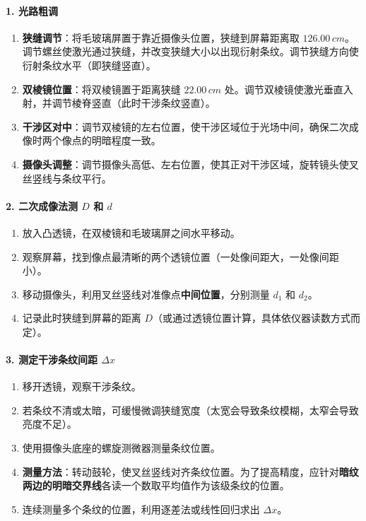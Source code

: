 \documentclass[yuxi]{../template/Report}%
\begin{document}
\paragraph{1. 光路粗调}
\begin{enumerate}
    \item \textbf{狭缝调节}：将毛玻璃屏置于靠近摄像头位置，狭缝到屏幕距离取 $126.00\,cm$。调节螺丝使激光通过狭缝，并改变狭缝大小以出现衍射条纹。调节狭缝方向使衍射条纹水平（即狭缝竖直）。
    \item \textbf{双棱镜位置}：将双棱镜置于距离狭缝 $22.00\,cm$ 处。调节双棱镜使激光垂直入射，并调节棱脊竖直（此时干涉条纹竖直）。
    \item \textbf{干涉区对中}：调节双棱镜的左右位置，使干涉区域位于光场中间，确保二次成像时两个像点的明暗程度一致。
    \item \textbf{摄像头调整}：调节摄像头高低、左右位置，使其正对干涉区域，旋转镜头使叉丝竖线与条纹平行。
\end{enumerate}


\paragraph{2. 二次成像法测 $D$ 和 $d$}
\begin{enumerate}
    \item 放入凸透镜，在双棱镜和毛玻璃屏之间水平移动。
    \item 观察屏幕，找到像点最清晰的两个透镜位置（一处像间距大，一处像间距小）。
    \item 移动摄像头，利用叉丝竖线对准像点\textbf{中间位置}，分别测量 $d_1$ 和 $d_2$。
    \item 记录此时狭缝到屏幕的距离 $D$（或通过透镜位置计算，具体依仪器读数方式而定）。
\end{enumerate}



\paragraph{3. 测定干涉条纹间距 $\Delta x$}
\begin{enumerate}
    \item 移开透镜，观察干涉条纹。
    \item 若条纹不清或太暗，可缓慢微调狭缝宽度（太宽会导致条纹模糊，太窄会导致亮度不足）。
    \item 使用摄像头底座的螺旋测微器测量条纹位置。
    \item \textbf{测量方法}：转动鼓轮，使叉丝竖线对齐条纹位置。为了提高精度，应针对\textbf{暗纹两边的明暗交界线}各读一个数取平均值作为该级条纹的位置。
    \item 连续测量多个条纹的位置，利用逐差法或线性回归求出 $\Delta x$。
\end{enumerate}
\end{document}
